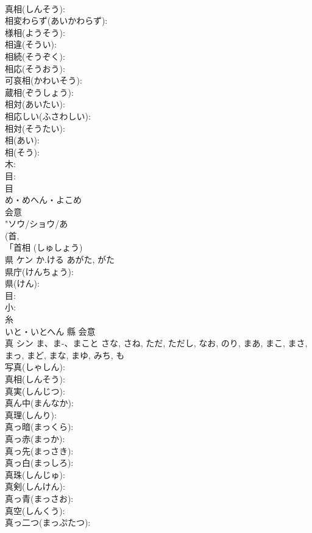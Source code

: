 \documentclass[8pt]{extreport}
\begin{document}
\begin{CJK}{UTF8}{min}
\\	真相(しんそう): 
\\	相変わらず(あいかわらず): 
\\	様相(ようそう): 
\\	相違(そうい): 
\\	相続(そうぞく): 
\\	相応(そうおう): 
\\	可哀相(かわいそう): 
\\	蔵相(ぞうしょう): 
\\	相対(あいたい): 
\\	相応しい(ふさわしい): 
\\	相対(そうたい): 
\\	相(あい): 
\\	相(そう): 
\\	木: 
\\	目: 
\\	目	
\\	め・めへん・よこめ	
\\	会意 
\\	"ソウ/ショウ/あ 
\\	(首, 
\\	「首相 (しゅしょう)
\\	県	ケン	か.ける	あがた, がた	
\\	県庁(けんちょう): 
\\	県(けん): 
\\	目: 
\\	小: 
\\	糸	
\\	いと・いとへん	縣	会意 
\\	真	シン	ま、ま-、まこと	さな, さね, ただ, ただし, なお, のり, まあ, まこ, まさ, まっ, まど, まな, まゆ, みち, も	
\\	写真(しゃしん): 
\\	真相(しんそう): 
\\	真実(しんじつ): 
\\	真ん中(まんなか): 
\\	真理(しんり): 
\\	真っ暗(まっくら): 
\\	真っ赤(まっか): 
\\	真っ先(まっさき): 
\\	真っ白(まっしろ): 
\\	真珠(しんじゅ): 
\\	真剣(しんけん): 
\\	真っ青(まっさお): 
\\	真空(しんくう): 
\\	真っ二つ(まっぷたつ): 

\end{CJK}
\end{document}
